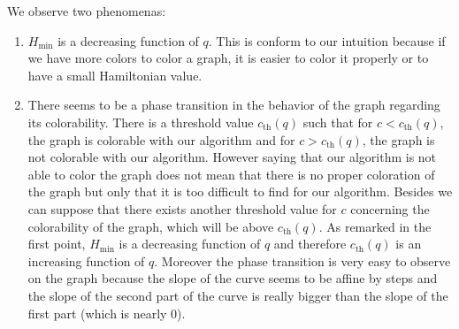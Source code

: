 \documentclass[a4paper]{article}
\begin{document}
We observe two phenomenas:
\begin{enumerate}
\item $H_{\min}$ is a decreasing function of $q$. This is conform to our intuition because if we have more colors to color a graph, it is easier to color it properly or to have a small Hamiltonian value.
\item There seems to be a phase transition in the behavior of the graph regarding its colorability. There is a threshold value $c_{\mathrm{th}}(q)$ such that for $c<c_{\mathrm{th}}(q)$, the graph is colorable with our algorithm and for $c>c_{\mathrm{th}}(q)$, the graph is not colorable with our algorithm. However saying that our algorithm is not able to color the graph does not mean that there is no proper coloration of the graph but only that it is too difficult to find for our algorithm. Besides we can suppose that there exists another threshold value for $c$ concerning the colorability of the graph, which will be above $c_{\mathrm{th}}(q)$. As remarked in the first point, $H_{\min}$ is a decreasing function of $q$ and therefore $c_{\mathrm{th}}(q)$ is an increasing function of $q$. Moreover the phase transition is very easy to observe on the graph because the slope of the curve seems to be affine by steps and the slope of the second part of the curve is really bigger than the slope of the first part (which is nearly $0$).
\end{enumerate}



\end{document}
